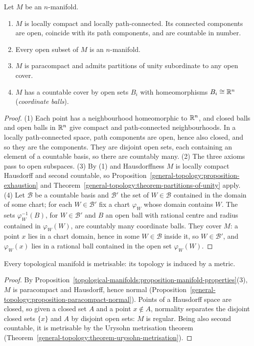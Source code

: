\begin{proposition}\label{topological-manifolds:proposition-manifold-properties}
Let $M$ be an $n$-manifold.
\begin{enumerate}
\item $M$ is locally compact and locally path-connected. Its connected components are open, coincide with its path components, and are countable in number.
\item Every open subset of $M$ is an $n$-manifold.
\item $M$ is paracompact and admits partitions of unity subordinate to any open cover.
\item $M$ has a countable cover by open sets $B_i$ with homeomorphisms $B_i \cong \mathbb{R}^n$ (\emph{coordinate balls}).
\end{enumerate}
\end{proposition}

\begin{proof}
(1) Each point has a neighbourhood homeomorphic to $\mathbb{R}^n$, and closed balls and open balls in $\mathbb{R}^n$ give compact and path-connected neighbourhoods. In a locally path-connected space, path components are open, hence
also closed, and so they are the components. They are disjoint open sets, each containing an element of a countable basis, so there are countably many. (2) The three axioms pass to open subspaces. (3) By (1) and
Hausdorffness $M$ is locally compact Hausdorff and second countable, so Proposition~\ref{general-topology:proposition-exhaustion} and Theorem~\ref{general-topology:theorem-partitions-of-unity} apply. (4) Let
$\mathcal{B}$ be a countable basis and $\mathcal{B}'$ the set of $W \in \mathcal{B}$ contained in the domain of some chart; for each $W \in \mathcal{B}'$ fix a chart $\varphi_W$ whose domain contains $W$. The sets $\varphi_W^{-1}(B)$, for
$W \in \mathcal{B}'$ and $B$ an open ball with rational centre and radius contained in $\varphi_W(W)$, are countably many coordinate balls. They cover $M$: a point $x$ lies in a chart domain, hence in some $W \in \mathcal{B}$ inside it,
so $W \in \mathcal{B}'$, and $\varphi_W(x)$ lies in a rational ball contained in the open set $\varphi_W(W)$.
\end{proof}

\begin{corollary}\label{topological-manifolds:corollary-metrisable}
Every topological manifold is metrisable: its topology is induced by a metric.
\end{corollary}

\begin{proof}
By Proposition~\ref{topological-manifolds:proposition-manifold-properties}(3), $M$ is paracompact and Hausdorff, hence normal (Proposition~\ref{general-topology:proposition-paracompact-normal}). Points of a Hausdorff
space are closed, so given a closed set $A$ and a point $x \notin A$, normality separates the disjoint closed sets $\{x\}$ and $A$ by disjoint open sets: $M$ is regular. Being also second countable, it is metrisable
by the Urysohn metrisation theorem (Theorem~\ref{general-topology:theorem-urysohn-metrisation}).
\end{proof}

